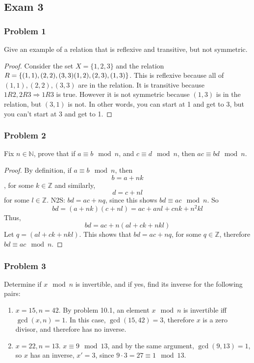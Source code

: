 \documentclass[hidelinks,12pt]{article}
\newcommand{\N}{\mathbb{N}}
\newcommand{\Z}{\mathbb{Z}}
\begin{document}
\subsection{Exam 3}
\subsubsection{Problem 1}
Give an example of a relation that is reflexive and transitive, but not symmetric.
\begin{proof}
Consider the set $X=\{1,2,3\}$ and the relation $R=\{(1,1),(2,2),(3,3)\newline(1,2),(2,3),(1,3)\}$. This is reflexive because all of $(1,1),(2,2),(3,3)$ are in the relation. It is transitive because $1R2,2R3\Longrightarrow1R3$ is true. However it is not symmetric because $(1,3)$ is in the relation, but $(3,1)$ is not. In other words, you can start at 1 and get to 3, but you can't start at 3 and get to 1.
\end{proof}
\subsubsection{Problem 2}
Fix $n\in\N$, prove that if $a\equiv b\mod{n}$, and $c\equiv d\mod{n}$, then $ac\equiv bd\mod{n}$.
\begin{proof}
By definition, if $a\equiv b\mod{n}$, then $$b=a+nk$$, for some $k\in\Z$ and similarly, $$d=c+nl$$ for some $l\in\Z$. \newline N2S: $bd=ac+nq$, since this shows $bd\equiv ac\mod{n}$. So $$bd=(a+nk)(c+nl)=ac+anl+cnk+n^2kl$$ Thus, $$bd=ac+n(al+ck+nkl)$$ Let $q=(al+ck+nkl)$. This shows that $bd=ac+nq$, for some $q\in\Z$, therefore $bd\equiv ac\mod{n}$.
\end{proof}
\subsubsection{Problem 3}
Determine if $x\mod{n}$ is invertible, and if yes, find its inverse for the following pairs:
\begin{enumerate}
    \item $x=15, n=42$. By problem 10.1, an element $x\mod{n}$ is invertible iff $\gcd(x,n)=1$. In this case, $\gcd(15,42)=3$, therefore $x$ is a zero divisor, and therefore has no inverse.
    \item $x=22, n=13$. $x\equiv9\mod{13}$, and by the same argument, $\gcd(9,13)=1$, so $x$ has an inverse, $x'=3$, since $9\cdot3=27\equiv1\mod{13}$.
\end{enumerate}
\end{document}
